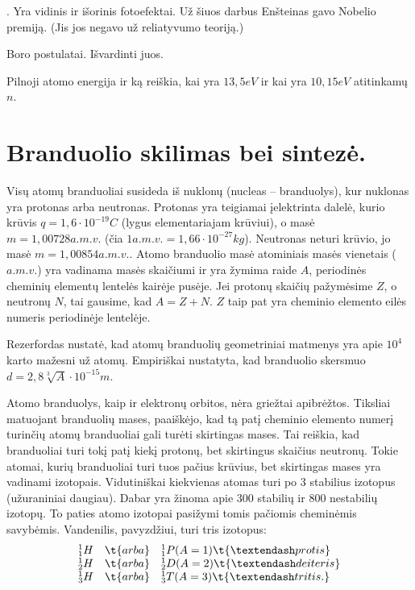 .
Yra vidinis ir išorinis fotoefektai. Už šiuos darbus Enšteinas gavo
Nobelio premiją. (Jis jos negavo už reliatyvumo teoriją.)

\begin{remember}
  \item Boro postulatai. Išvardinti juos.
  \item Pilnoji atomo energija ir ką reiškia, kai yra $13,5 eV$ ir
    kai yra $10,15 eV$ atitinkamų $n$.
\end{remember}

\section{Branduolio skilimas bei sintezė.}

Visų atomų branduoliai susideda iš nuklonų (nucleas – branduolys),
kur nuklonas yra protonas arba neutronas. Protonas yra teigiamai
įelektrinta dalelė, kurio krūvis $q = 1,6 \cdot 10^{-19} C$ (lygus
elementariajam krūviui), o masė $m = 1,00728 a.m.v.$ (čia
$1 a.m.v. = 1,66\cdot 10^{-27}kg$). Neutronas neturi krūvio, jo
masė $m = 1,00854 a.m.v.$. Atomo branduolio masė atominiais masės
vienetais ($a.m.v.$) yra vadinama masės skaičiumi ir yra žymima
raide $A$, periodinės cheminių elementų lentelės kairėje pusėje.
Jei protonų skaičių pažymėsime $Z$, o neutronų $N$, tai gausime,
kad $A = Z + N$. $Z$ taip pat yra cheminio elemento eilės numeris
periodinėje lentelėje.

Rezerfordas nustatė, kad atomų branduolių geometriniai matmenys yra
apie $10^{4}$ karto mažesni už atomų. Empiriškai nustatyta, kad
branduolio skersmuo $d = 2,8\sqrt[3]{A} \cdot 10^{-15} m$.

Atomo branduolys, kaip ir elektronų orbitos, nėra griežtai
apibrėžtos. Tiksliai matuojant branduolių mases, paaiškėjo, kad tą
patį cheminio elemento numerį turinčių atomų  branduoliai gali
turėti skirtingas mases. Tai reiškia, kad branduoliai turi tokį patį
kiekį protonų, bet skirtingus skaičius neutronų. Tokie atomai,
kurių branduoliai turi tuos pačius krūvius, bet skirtingas mases yra
vadinami izotopais. Vidutiniškai kiekvienas atomas turi po 3 stabilius
izotopus (užuraniniai daugiau). Dabar yra žinoma apie 300 stabilių ir
800 nestabilių izotopų. To paties atomo izotopai pasižymi tomis pačiomis
cheminėmis savybėmis. Vandenilis, pavyzdžiui, turi tris izotopus:
\begin{equation*}
  \begin{array}[]{c c l}
    {}^{1}_{1}H & \t{arba} & {}^{1}_{1}P(A=1) \t{– protis} \\
    {}^{1}_{2}H & \t{arba} & {}^{1}_{2}D(A=2) \t{– deiteris} \\
    {}^{1}_{3}H & \t{arba} & {}^{1}_{3}T(A=3) \t{– tritis.} \\
  \end{array}
\end{equation*}

